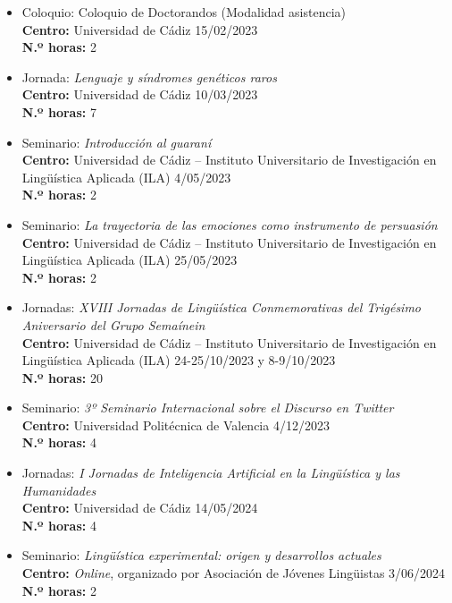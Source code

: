 \begin{enumerate}[label=\alph*)]
\begin{itemize}
\begin{itemize}[label=\textbullet]
  \item Coloquio: Coloquio de Doctorandos (Modalidad asistencia) \\
  \textbf{Centro:} Universidad de Cádiz
  \hfill 15/02/2023\\
  \textbf{N.º horas:} 2

  \item Jornada: \textit{Lenguaje y síndromes genéticos raros}\\
  \textbf{Centro:} Universidad de Cádiz
  \hfill 10/03/2023\\
  \textbf{N.º horas:} 7

  \item Seminario: \textit{Introducción al guaraní}\\
  \textbf{Centro:} Universidad de Cádiz – Instituto Universitario de Investigación en Lingüística Aplicada (ILA)
  \hfill 4/05/2023\\
  \textbf{N.º horas:} 2

  \item Seminario: \textit{La trayectoria de las emociones como instrumento de persuasión}\\
  \textbf{Centro:} Universidad de Cádiz – Instituto Universitario de Investigación en Lingüística Aplicada (ILA)
  \hfill 25/05/2023\\
  \textbf{N.º horas:} 2

  \item Jornadas: \textit{XVIII Jornadas de Lingüística Conmemorativas del Trigésimo Aniversario del Grupo Semaínein}\\
  \textbf{Centro:} Universidad de Cádiz – Instituto Universitario de Investigación en Lingüística Aplicada (ILA)
  \hfill 24-25/10/2023 y 8-9/10/2023\\
  \textbf{N.º horas:} 20

  \item Seminario: \textit{3º Seminario Internacional sobre el Discurso en Twitter}\\
  \textbf{Centro:} Universidad Politécnica de Valencia
  \hfill 4/12/2023\\
  \textbf{N.º horas:} 4

  \item Jornadas: \textit{I Jornadas de Inteligencia Artificial en la Lingüística y las Humanidades}\\
  \textbf{Centro:} Universidad de Cádiz
  \hfill 14/05/2024\\
  \textbf{N.º horas:} 4

  \item Seminario: \textit{Lingüística experimental: origen y desarrollos actuales}\\
  \textbf{Centro:} \textit{Online}, organizado por Asociación de Jóvenes Lingüistas
  \hfill 3/06/2024\\
  \textbf{N.º horas:} 2


\end{itemize}
\end{itemize}
\end{enumerate}
